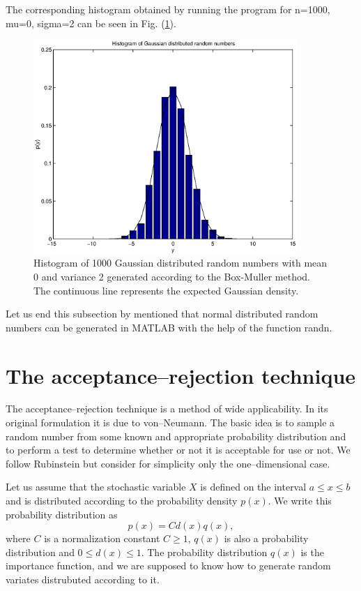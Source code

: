 The corresponding histogram obtained by running the program for
n=1000, mu=0, sigma=2 can be seen in Fig. (\ref{F_GAUSSDISTR}).
\begin{figure}
\label{F_GAUSSDISTR}
\includegraphics[width=10cm]{./Figures/f_gaussdistr.eps}
\caption{Histogram of 1000 Gaussian distributed random numbers with
mean 0 and variance 2 generated according to the Box-Muller method. 
The continuous line represents the expected Gaussian density.}
\end{figure}

Let us end this subsection by mentioned that normal distributed
random numbers can be generated in MATLAB with the help of 
the function {\sf randn}.

\section{The acceptance--rejection technique}
The acceptance--rejection technique is a method of wide 
applicability. In its original formulation it is due to 
von--Neumann. The basic idea is to sample a random number
from some known and appropriate probability distribution and to 
perform a test to determine whether or not it is acceptable for 
use or not. We follow Rubinstein but consider for simplicity only
the one--dimensional case.

Let us assume that the stochastic variable $X$ is defined on the 
interval $a \le x \le b$ and is distributed according to the
probability density $p(x)$. We write this probability distribution 
as
\begin{equation*}
p(x) = C d(x) q(x),
\end{equation*}
where $C$ is a normalization constant $C \ge 1$, $q(x)$ is also a 
probability distribution and $0 \le d(x) \le 1$. The probability 
distribution $q(x)$ is the importance function, and  we are 
supposed to know how to generate random variates distrubuted 
according to it.

